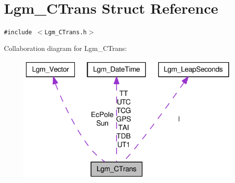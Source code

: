 \hypertarget{struct_lgm___c_trans}{
\section{Lgm\_\-CTrans Struct Reference}
\label{struct_lgm___c_trans}
}
{\tt \#include $<$Lgm\_\-CTrans.h$>$}

Collaboration diagram for Lgm\_\-CTrans:\nopagebreak
\begin{figure}[H]
\begin{center}
\leavevmode
\includegraphics[width=328pt]{struct_lgm___c_trans__coll__graph}
\end{center}
\end{figure}
